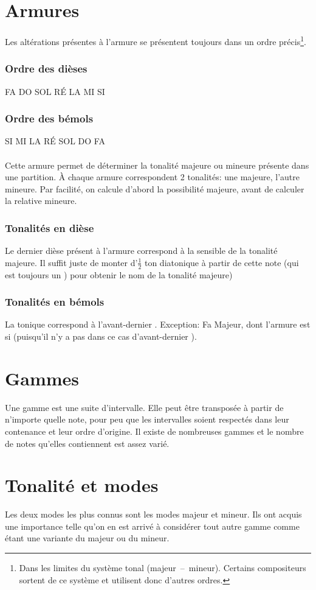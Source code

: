 \documentclass[11pt,a4paper]{scrreprt}
\begin{document}
\section{Armures}
Les altérations présentes à l'armure se présentent toujours dans un ordre précis\footnote{Dans les limites du système tonal (majeur~--~mineur). Certains compositeurs sortent de ce système et utilisent donc d'autres ordres.}.
\subsubsection{Ordre des dièses}
FA DO SOL RÉ LA MI SI
\subsubsection{Ordre des bémols}
SI MI LA RÉ SOL DO FA
\\
\\
Cette armure permet de déterminer la tonalité majeure ou mineure présente dans une partition. À chaque armure correspondent 2 tonalités: une majeure, l'autre mineure. Par facilité, on calcule d'abord la possibilité majeure, avant de calculer la relative mineure.

\subsubsection{Tonalités en dièse}
Le dernier dièse présent à l'armure correspond à la sensible de la tonalité majeure. Il suffit juste de monter d'$\frac1 2$ ton diatonique à partir de cette note (qui est toujours un \fetasharp{}) pour obtenir le nom de la tonalité majeure)
\subsubsection{Tonalités en bémols}
La tonique correspond à l'avant-dernier \fetaflat. Exception: Fa Majeur, dont l'armure est si \fetaflat{} (puisqu'il n'y a pas dans ce cas d'avant-dernier \fetaflat).
\section{Gammes}
Une gamme est une suite d'intervalle. Elle peut être transposée à partir de n'importe quelle note, pour peu que les intervalles soient respectés dans leur contenance et leur ordre d'origine. Il existe de nombreuses gammes et le nombre de notes qu'elles contiennent est assez varié.
\section{Tonalité et modes}
Les deux modes les plus connus sont les modes majeur  et mineur. Ils ont acquis une importance telle qu'on en est arrivé à considérer tout autre gamme comme étant une variante du majeur ou du mineur.
\end{document}
